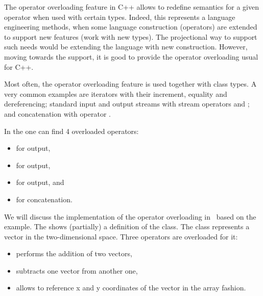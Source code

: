 
\cppproblem

The operator overloading feature in C++ allows to redefine semantics for a given operator when used 
with certain types. Indeed, this represents a language engineering methods, when some language construction 
(operators) are extended to support new features (work with new types). The projectional way to support such
needs would be extending the language with new construction. However, moving towards the  support, 
it is good to provide the operator overloading usual for C++.

Most often, the operator overloading feature is used together with class types. A very common examples are iterators with 
their increment, equality and dereferencing; standard input and output streams with stream operators \cc{<<} and \cc{>>}; and 
concatenation with operator \cc{+}.


In the  one can find 4 overloaded operators: 
\begin{itemize}
 \item for  output,
 \item for  output,
 \item for  output, and 
 \item for  concatenation.
\end{itemize}



\pcppsolution



We will discuss the implementation of the operator overloading in \pcpp\ based on the 
example. The  shows (partially) a definition of the  class.
The class represents a vector in the two-dimensional space. Three operators are overloaded for it:
\begin{itemize}
 \item {} performs the addition of two vectors,
 \item {} subtracts one vector from another one,
 \item {} allows to reference x and y coordinates of the vector in the array fashion.
\end{itemize}

